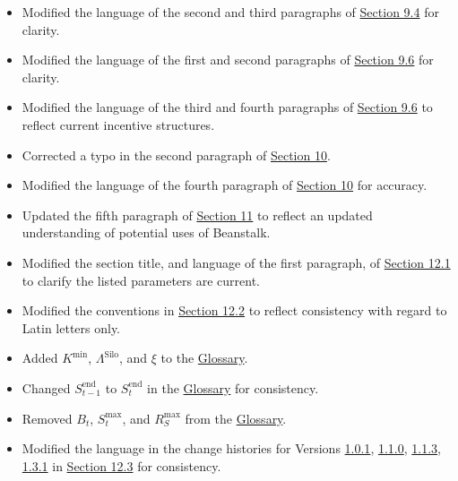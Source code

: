 \documentclass[class=article, crop=false]{standalone}
\begin{document}
\begin{itemize}[topsep=0pt, itemsep=3pt,leftmargin=16pt]
\begin{itemize}
        \item Modified the language of the second and third paragraphs of \hyperlink{subsection.9.4}{Section 9.4} for clarity.
        \item Modified the language of the first and second paragraphs of \hyperlink{subsection.9.6}{Section 9.6} for clarity.
        \item Modified the language of the third and fourth paragraphs of \hyperlink{subsection.9.6}{Section 9.6} to reflect current incentive structures.
        \item Corrected a typo in the second paragraph of \hyperlink{section.10}{Section 10}.
        \item Modified the language of the fourth paragraph of \hyperlink{section.10}{Section 10} for accuracy.
        \item Updated the fifth paragraph of \hyperlink{section.11}{Section 11} to reflect an updated understanding of potential uses of Beanstalk. 
        \item Modified the section title, and language of the first paragraph, of \hyperlink{subsection.12.1}{Section 12.1} to clarify the listed parameters are current.
        \item Modified the conventions in \hyperlink{subsection.12.2}{Section 12.2} to reflect consistency with regard to Latin letters only.
        \item Added $K^{\text{min}}$, $\Lambda^{\text{Silo}}$, and $\xi$ to the \hyperlink{subsection.14.11}{Glossary}. 
        \item Changed $S_{t-1}^{\text{end}}$ to $S_t^{\text{end}}$ in the \hyperlink{subsection.14.11}{Glossary} for consistency. 
        \item Removed $B_t$, $S_t^{\text{max}}$, and $R_S^{\text{max}}$ from the \hyperlink{subsection.14.11}{Glossary}. 
        \item Modified the language in the change histories for Versions \href{https://github.com/BeanstalkFarms/Beanstalk-Whitepaper/blob/master/version-history/beanstalk1_0_1.pdf}{1.0.1}, \href{https://github.com/BeanstalkFarms/Beanstalk-Whitepaper/blob/master/version-history/beanstalk1_1_0.pdf}{1.1.0}, \href{https://github.com/BeanstalkFarms/Beanstalk-Whitepaper/blob/master/version-history/beanstalk1_1_3.pdf}{1.1.3}, \href{https://github.com/BeanstalkFarms/Beanstalk-Whitepaper/blob/master/version-history/beanstalk1_3_1.pdf}{1.3.1} in \hyperlink{subsection.12.3}{Section 12.3} for consistency.
    \end{itemize}
    \newpage

\end{itemize}
\end{document}

